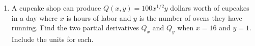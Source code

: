 \documentclass[10pt]{article}
\begin{document}
\begin{enumerate}
\newpage
%
%

\item A cupcake shop can produce $Q(x,y) = 100 x^{1/2} y$ dollars worth of cupcakes in a day where $x$ is hours of labor and $y$ is the number of ovens they have running.  Find the two partial derivatives $Q_x$ and $Q_y$ when $x = 16$ and $y = 1$.  Include the units for each.
\vfill





\end{enumerate}
\end{document}
